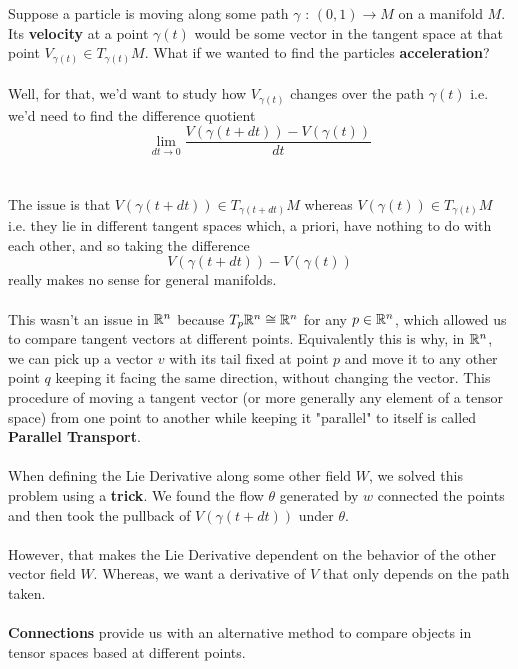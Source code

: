\documentclass[11pt]{article}
\begin{document}
Suppose a particle is moving along some path $\gamma \text{ : } (0, 1) \rightarrow M$ on a manifold $M$. Its \textbf{velocity} at a point $\gamma(t)$ would be some vector in the tangent space at that point $V_{\gamma(t)} \in T_{\gamma(t)} M$. What if we wanted to find the particles \textbf{acceleration}?
\\
\\
Well, for that, we'd want to study how $V_{\gamma(t)}$ changes over the path $\gamma(t)$ i.e. we'd need to find the difference quotient 
\[ \lim_{dt \rightarrow 0} \frac{V(\gamma(t + dt)) - V(\gamma(t))}{dt} \]
\\
\\
The issue is that $V(\gamma(t + dt)) \in T_{\gamma(t + dt)} M$ whereas $V(\gamma(t)) \in  T_{\gamma(t)} M$ i.e. they lie in different tangent spaces which, a priori, have nothing to do with each other, and so taking the difference 
\[ V(\gamma(t + dt)) - V(\gamma(t)) \]
really makes no sense for general manifolds.
\\
\\ 
This wasn't an issue in $\mathbb{R}^n$ because $T_p \mathbb{R}^n \cong \mathbb{R}^n$ for any $p \in \mathbb{R}^n$, which allowed us to compare tangent vectors at different points. Equivalently this is why, in $\mathbb{R}^n$, we can pick up a vector $v$ with its tail fixed at point $p$ and move it to any other point $q$ keeping it facing the same direction, without changing the vector. This procedure of moving a tangent vector (or more generally any element of a tensor space) from one point to another while keeping it "parallel" to itself is called \textbf{Parallel Transport}.
\\
\\
When defining the Lie Derivative along some other field $W$, we solved this problem using a \textbf{trick}. We found the flow $\theta$ generated by $w$ connected the points and then took the pullback of $V(\gamma(t + dt))$ under $\theta$. 
\\
\\
However, that makes the Lie Derivative dependent on the behavior of the other vector field $W$. Whereas, we want a derivative of $V$ that only depends on the path taken.
\\
\\
\textbf{Connections} provide us with an alternative method to compare objects in tensor spaces based at different points.
\end{document}
